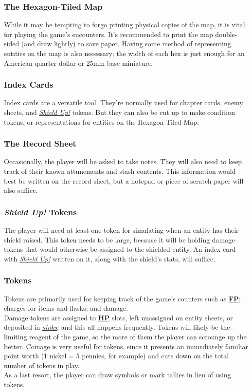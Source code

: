 \documentclass[12pt]{article}
\newcommand{\refto}[1]{\hyperlink{#1}{\textbf{#1}}}
\newcommand{\reftoit}[1]{\hyperlink{#1}{\emph{#1}}}
\begin{document}
\begin{multicols*}{2}
\subsubsection*{The Hexagon-Tiled Map}
While it may be tempting to forgo printing physical copies of the map, it is vital for playing the game’s encounters. It’s recommended to print the map double-sided (and draw lightly) to save paper. Having some method of representing entities on the map is also necessary; the width of each hex is just enough for an American quarter-dollar or 25mm base miniature.

\subsubsection*{Index Cards}
Index cards are a versatile tool. They’re normally used for chapter cards, enemy sheets, and \reftoit{Shield Up!} tokens. But they can also be cut up to make condition tokens, or representations for entities on the Hexagon-Tiled Map.

\subsubsection*{The Record Sheet}
Occasionally, the player will be asked to take notes. They will also need to keep track of their known attunements and stash contents. This information would best be written on the record sheet, but a notepad or piece of scratch paper will also suffice.

\subsubsection*{\emph{Shield Up!} Tokens}
The player will need at least one token for simulating when an entity has their shield raised. This token needs to be large, because it will be holding damage tokens that would otherwise be assigned to the shielded entity. An index card with \reftoit{Shield Up!} written on it, along with the shield’s stats, will suffice.

\subsubsection*{Tokens}
Tokens are primarily used for keeping track of the game’s counters such as \refto{FP}; charges for items and flasks; and damage.\\
Damage tokens are assigned to \refto{HP} slots, left unassigned on entity sheets, or deposited in \reftoit{sinks}; and this all happens frequently. Tokens will likely be the limiting reagent of the game, so the more of them the player can scrounge up the better. Coinage is very useful for tokens, since it presents an immediately familiar point worth (1 nickel = 5 pennies, for example) and cuts down on the total number of tokens in play.\\
As a last resort, the player can draw symbols or mark tallies in lieu of using tokens.
\end{multicols*}
\end{document}

